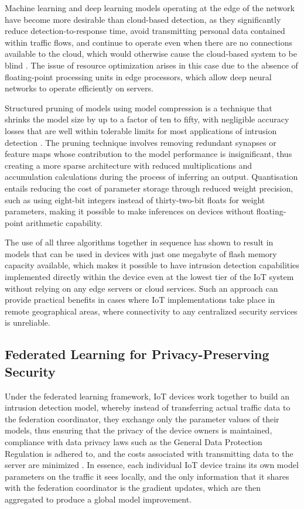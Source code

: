 \documentclass[12pt]{article}
\begin{document}
Machine learning and deep learning models operating at the edge of the network have become more desirable than cloud-based detection, as they significantly reduce detection-to-response time, avoid transmitting personal data contained within traffic flows, and continue to operate even when there are no connections available to the cloud, which would otherwise cause the cloud-based system to be blind \cite{thamilarasu2019towards}. The issue of resource optimization arises in this case due to the absence of floating-point processing units in edge processors, which allow deep neural networks to operate efficiently on servers.

Structured pruning of models using model compression is a technique that shrinks the model size by up to a factor of ten to fifty, with negligible accuracy losses that are well within tolerable limits for most applications of intrusion detection \cite{ge2019deep}. The pruning technique involves removing redundant synapses or feature maps whose contribution to the model performance is insignificant, thus creating a more sparse architecture with reduced multiplications and accumulation calculations during the process of inferring an output. Quantisation entails reducing the cost of parameter storage through reduced weight precision, such as using eight-bit integers instead of thirty-two-bit floats for weight parameters, making it possible to make inferences on devices without floating-point arithmetic capability.

The use of all three algorithms together in sequence has shown to result in models that can be used in devices with just one megabyte of flash memory capacity available, which makes it possible to have intrusion detection capabilities implemented directly within the device even at the lowest tier of the IoT system without relying on any edge servers or cloud services. Such an approach can provide practical benefits in cases where IoT implementations take place in remote geographical areas, where connectivity to any centralized security services is unreliable.

\subsection{Federated Learning for Privacy-Preserving Security}

Under the federated learning framework, IoT devices work together to build an intrusion detection model, whereby instead of transferring actual traffic data to the federation coordinator, they exchange only the parameter values of their models, thus ensuring that the privacy of the device owners is maintained, compliance with data privacy laws such as the General Data Protection Regulation is adhered to, and the costs associated with transmitting data to the server are minimized \cite{lyu2021towards}. In essence, each individual IoT device trains its own model parameters on the traffic it sees locally, and the only information that it shares with the federation coordinator is the gradient updates, which are then aggregated to produce a global model improvement.
\end{document}
